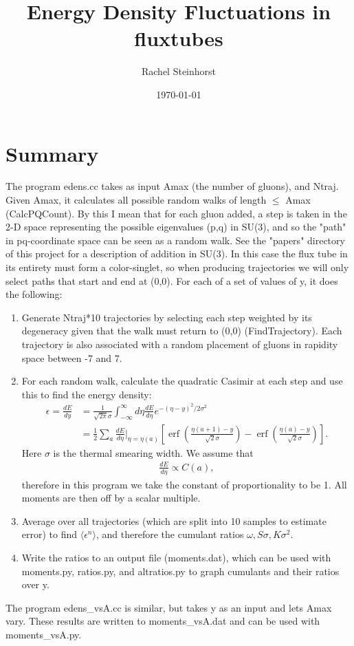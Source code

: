 \documentclass{article}
\DeclareMathOperator\erf{erf}
\begin{document}
\title{Energy Density Fluctuations in fluxtubes}
\author{Rachel Steinhorst}
\date{\today}
\maketitle

\section*{Summary}
The program edens.cc takes as input Amax (the number of gluons), and Ntraj. Given Amax, it calculates all possible random walks of length $\leq$ Amax (CalcPQCount). By this I mean that for each gluon added, a step is taken in the 2-D space representing the possible eigenvalues (p,q) in SU(3), and so the "path" in pq-coordinate space can be seen as a random walk. See the "papers" directory of this project for a description of addition in SU(3). In this case the flux tube in its entirety must form a color-singlet, so when producing trajectories we will only select paths that start and end at (0,0). For each of a set of values of y, it does the following:
\begin{enumerate}
  \item Generate Ntraj*10 trajectories by selecting each step weighted by its degeneracy given that the walk must return to (0,0) (FindTrajectory). Each trajectory is also associated with a random placement of gluons in rapidity space between -7 and 7.
  \item For each random walk, calculate the quadratic Casimir at each step and use this to find the energy density:
  \begin{align*}
  \epsilon = \frac{dE}{dy} &= \frac{1}{\sqrt{2 \pi} \sigma} \int_{-\infty}^{\infty} d\eta \frac{dE}{d\eta} e^{-(\eta-y)^2/2\sigma^2}  \\ 
  &= \frac{1}{2} \sum_a \frac{dE}{d\eta}\Bigr\rvert_{\eta=\eta(a)} \left[ \erf\left(\frac{\eta(a+1)-y}{\sqrt{2}\sigma}\right) - \erf\left(\frac{\eta(a)-y}{\sqrt{2}\sigma}\right)\right].
  \end{align*}
 Here $\sigma$ is the thermal smearing width. We assume that
 \begin{align*}
 \frac{dE}{d\eta} \propto C(a),
 \end{align*}
 therefore in this program we take the constant of proportionality to be 1. All moments are then off by a scalar multiple.
  \item Average over all trajectories (which are split into 10 samples to estimate error) to find $\langle\epsilon^n\rangle$, and therefore the cumulant ratios $\omega, S\sigma, K\sigma^2$.
  \item Write the ratios to an output file (moments.dat), which can be used with moments.py, ratios.py, and altratios.py to graph cumulants and their ratios over y.
\end{enumerate}
The program edens\_vsA.cc is similar, but takes y as an input and lets Amax vary. These results are written to moments\_vsA.dat and can be used with moments\_vsA.py.
\end{document}
